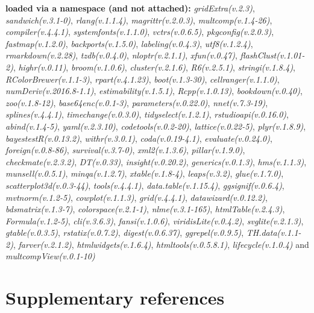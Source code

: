 \documentclass[
  bookmarksnumbered]{article}
\begin{document}
\textbf{loaded via a namespace (and not attached):}
\emph{gridExtra(v.2.3)}, \emph{sandwich(v.3.1-0)}, \emph{rlang(v.1.1.4)}, \emph{magrittr(v.2.0.3)}, \emph{multcomp(v.1.4-26)}, \emph{compiler(v.4.4.1)}, \emph{systemfonts(v.1.1.0)}, \emph{vctrs(v.0.6.5)}, \emph{pkgconfig(v.2.0.3)}, \emph{fastmap(v.1.2.0)}, \emph{backports(v.1.5.0)}, \emph{labeling(v.0.4.3)}, \emph{utf8(v.1.2.4)}, \emph{rmarkdown(v.2.28)}, \emph{tzdb(v.0.4.0)}, \emph{nloptr(v.2.1.1)}, \emph{xfun(v.0.47)}, \emph{flashClust(v.1.01-2)}, \emph{highr(v.0.11)}, \emph{broom(v.1.0.6)}, \emph{cluster(v.2.1.6)}, \emph{R6(v.2.5.1)}, \emph{stringi(v.1.8.4)}, \emph{RColorBrewer(v.1.1-3)}, \emph{rpart(v.4.1.23)}, \emph{boot(v.1.3-30)}, \emph{cellranger(v.1.1.0)}, \emph{numDeriv(v.2016.8-1.1)}, \emph{estimability(v.1.5.1)}, \emph{Rcpp(v.1.0.13)}, \emph{bookdown(v.0.40)}, \emph{zoo(v.1.8-12)}, \emph{base64enc(v.0.1-3)}, \emph{parameters(v.0.22.0)}, \emph{nnet(v.7.3-19)}, \emph{splines(v.4.4.1)}, \emph{timechange(v.0.3.0)}, \emph{tidyselect(v.1.2.1)}, \emph{rstudioapi(v.0.16.0)}, \emph{abind(v.1.4-5)}, \emph{yaml(v.2.3.10)}, \emph{codetools(v.0.2-20)}, \emph{lattice(v.0.22-5)}, \emph{plyr(v.1.8.9)}, \emph{bayestestR(v.0.13.2)}, \emph{withr(v.3.0.1)}, \emph{coda(v.0.19-4.1)}, \emph{evaluate(v.0.24.0)}, \emph{foreign(v.0.8-86)}, \emph{survival(v.3.7-0)}, \emph{xml2(v.1.3.6)}, \emph{pillar(v.1.9.0)}, \emph{checkmate(v.2.3.2)}, \emph{DT(v.0.33)}, \emph{insight(v.0.20.2)}, \emph{generics(v.0.1.3)}, \emph{hms(v.1.1.3)}, \emph{munsell(v.0.5.1)}, \emph{minqa(v.1.2.7)}, \emph{xtable(v.1.8-4)}, \emph{leaps(v.3.2)}, \emph{glue(v.1.7.0)}, \emph{scatterplot3d(v.0.3-44)}, \emph{tools(v.4.4.1)}, \emph{data.table(v.1.15.4)}, \emph{ggsignif(v.0.6.4)}, \emph{mvtnorm(v.1.2-5)}, \emph{cowplot(v.1.1.3)}, \emph{grid(v.4.4.1)}, \emph{datawizard(v.0.12.2)}, \emph{bdsmatrix(v.1.3-7)}, \emph{colorspace(v.2.1-1)}, \emph{nlme(v.3.1-165)}, \emph{htmlTable(v.2.4.3)}, \emph{Formula(v.1.2-5)}, \emph{cli(v.3.6.3)}, \emph{fansi(v.1.0.6)}, \emph{viridisLite(v.0.4.2)}, \emph{svglite(v.2.1.3)}, \emph{gtable(v.0.3.5)}, \emph{rstatix(v.0.7.2)}, \emph{digest(v.0.6.37)}, \emph{ggrepel(v.0.9.5)}, \emph{TH.data(v.1.1-2)}, \emph{farver(v.2.1.2)}, \emph{htmlwidgets(v.1.6.4)}, \emph{htmltools(v.0.5.8.1)}, \emph{lifecycle(v.1.0.4)} and \emph{multcompView(v.0.1-10)}

\section{Supplementary references}\label{refs}

\begin{multicols}{2}
\AtNextBibliography{\footnotesize}
\printbibliography[heading=none]
\normalsize
\end{multicols}

\def\printbibliography{}

\printbibliography
\end{document}
